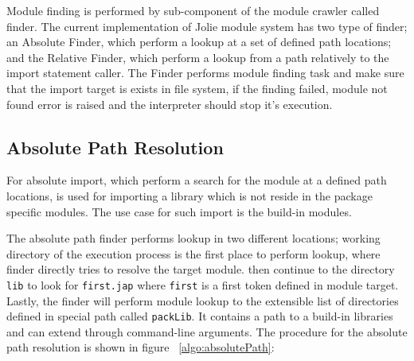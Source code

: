 Module finding is performed by sub-component of the module crawler called finder. The current implementation of Jolie module system has two type of finder; an Absolute Finder, which perform a lookup at a set of defined path locations; and the Relative Finder, which perform a lookup from a path relatively to the import statement caller. The Finder performs module finding task and make sure that the import target is exists in file system, if the finding failed, module not found error is raised and the interpreter should stop it's execution.

\subsection{ Absolute Path Resolution }

For absolute import, which perform a search for the module at a defined path locations, is used for importing a library which is not reside in the package specific modules. The use case for such import is the build-in modules.

The absolute path finder performs lookup in two different locations; working directory of the execution process is the first place to perform lookup, where finder directly tries to resolve the target module. then continue to the directory \texttt{lib} to look for \texttt{first.jap} where \texttt{first} is a first token defined in module target. Lastly, the finder will perform module lookup to the extensible list of directories defined in special path called \texttt{packLib}. It contains a path to a build-in libraries and can extend through command-line arguments. The procedure for the absolute path resolution is shown in figure ~\ref{algo:absolutePath}:

